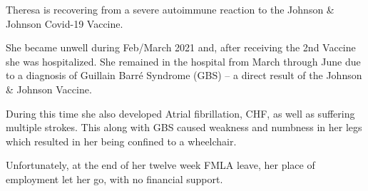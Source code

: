 Theresa is recovering from a severe autoimmune reaction to the Johnson \& Johnson
Covid-19 Vaccine.

She became unwell during Feb/March 2021 and, after receiving the 2nd Vaccine
she was hospitalized. She remained in the hospital from March through June due
to a diagnosis of Guillain Barré Syndrome (GBS) – a direct result of the Johnson
\& Johnson Vaccine.

During this time she also developed Atrial fibrillation, CHF, as well as
suffering multiple strokes. This along with GBS caused weakness and numbness in
her legs which resulted in her being confined to a wheelchair.

Unfortunately, at the end of her twelve week FMLA leave, her place of employment
let her go, with no financial support.
